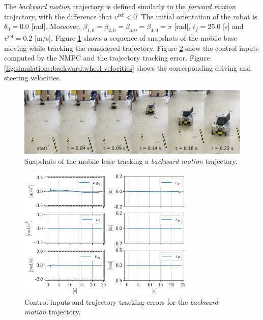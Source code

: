 The \textit{backward motion} trajectory is defined similarly to the \textit{forward motion} trajectory, with the difference that $v^{\mathrm{ref}}<0$. The initial orientation of the robot is $\theta_0=0.0$ [rad]. Moreover, $\beta_{1,0}=\beta_{2,0}=\beta_{3,0}=\beta_{4,0}=\pi$ [rad], $t_f = 25.0$ [s] and $v^{\mathrm{ref}}=0.2$ [m/s]. Figure \ref{fig:experiments:backward:snapshots} shows a sequence of snapshots of the mobile base moving while tracking the considered trajectory. Figure \ref{fig:simulations:backward:inputs-and-errors} show the control inputs computed by the NMPC and the trajectory tracking error. Figure \ref{fig:simulations:backward:wheel-velocities} shows the corresponding driving and steering velocities.
\begin{figure}
    \centering
    \includegraphics[width=\textwidth]{figures/SWMR/simulations/backward/snapshots.jpeg}
    \caption{Snapshots of the mobile base tracking a \textit{backward motion} trajectory.}
    \label{fig:experiments:backward:snapshots}
\end{figure}
\begin{figure}
    \centering
    \includegraphics[width=0.75\textwidth]{figures/SWMR/simulations/backward/inputs_and_errors.pdf}
    \caption{Control inputs and trajectory tracking errors for the \textit{backward motion} trajectory.}
    \label{fig:simulations:backward:inputs-and-errors}
\end{figure}

